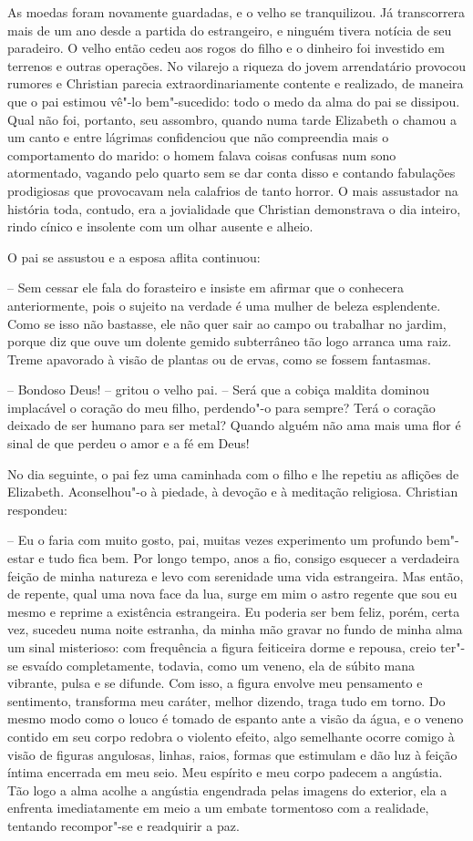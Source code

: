 As moedas foram novamente guardadas, e o velho se tranquilizou. Já
transcorrera mais de um ano desde a partida do estrangeiro, e ninguém
tivera notícia de seu paradeiro. O velho então cedeu aos rogos do filho
e o dinheiro foi investido em terrenos e outras operações. No vilarejo
a riqueza do jovem arrendatário provocou rumores e Christian parecia
extraordinariamente contente e realizado, de maneira que o pai estimou
vê"-lo bem"-sucedido: todo o medo da alma do pai se dissipou. Qual não
foi, portanto, seu assombro, quando numa tarde Elizabeth o chamou a um
canto e entre lágrimas confidenciou que não compreendia mais o
comportamento do marido: o homem falava coisas confusas num sono
atormentado, vagando pelo quarto sem se dar conta disso e contando
fabulações prodigiosas que provocavam nela calafrios de tanto horror. O
mais assustador na história toda, contudo, era a \mbox{jovialidade} que
Christian demonstrava o dia inteiro, rindo cínico e insolente com um
olhar ausente e alheio.

O pai se assustou e a esposa aflita continuou:

-- Sem cessar ele fala do forasteiro e insiste em afirmar que o
conhecera anteriormente, pois o sujeito na verdade é uma mulher de
beleza esplendente. Como se isso não bastasse, ele não quer sair ao
campo ou trabalhar no jardim, porque diz que ouve um dolente gemido
subterrâneo tão logo arranca uma raiz. Treme apavorado à visão de
plantas ou de ervas, como se fossem fantasmas.

-- Bondoso Deus! -- gritou o velho pai. -- Será que a cobiça maldita
dominou implacável o coração do meu filho, perdendo"-o para sempre? Terá
o coração deixado de ser humano para ser metal? Quando alguém não ama
mais uma flor é sinal de que perdeu o amor e a fé em Deus!

No dia seguinte, o pai fez uma caminhada com o filho e lhe repetiu as
aflições de Elizabeth. Aconselhou"-o à piedade, à devoção e à meditação
religiosa. Christian respondeu:

-- Eu o faria com muito gosto, pai, muitas vezes experimento um
profundo bem"-estar e tudo fica bem. Por longo tempo, anos a fio,
consigo esquecer a verdadeira feição de minha natureza e levo com
serenidade uma vida estrangeira. Mas então, de repente, qual uma nova
face da lua, surge em mim o astro regente que sou eu mesmo e reprime a
existência estrangeira. Eu poderia ser bem feliz, porém, certa vez,
sucedeu numa noite estranha, da minha mão gravar no fundo de minha alma
um sinal misterioso: com frequência a figura feiticeira dorme e
repousa, creio ter"-se esvaído completamente, todavia, como um veneno,
ela de súbito mana vibrante, pulsa e se difunde. Com isso, a figura
envolve meu pensamento e sentimento, transforma meu caráter, melhor
dizendo, traga tudo em torno. Do mesmo modo como o louco é tomado de
espanto ante a visão da água, e o veneno contido em seu corpo redobra o
violento efeito, algo semelhante ocorre comigo à visão de figuras
angulosas, linhas, raios, formas que estimulam e dão luz à feição
íntima encerrada em meu seio. Meu espírito e meu corpo padecem a
angústia. Tão logo a alma acolhe a angústia engendrada pelas imagens do
exterior, ela a enfrenta imediatamente em meio a um embate tormentoso
com a realidade, tentando recompor"-se e readquirir a paz.

